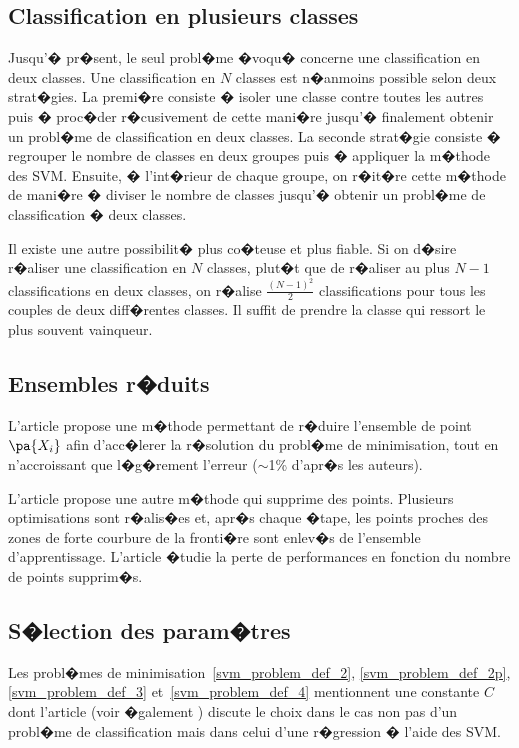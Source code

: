 \subsection{Classification en plusieurs classes}

Jusqu'� pr�sent, le seul probl�me �voqu� concerne une classification en deux classes. Une classification en $N$ classes est n�anmoins possible selon deux strat�gies. La premi�re consiste � isoler une classe contre toutes les autres puis � proc�der r�cusivement de cette mani�re jusqu'� finalement obtenir un probl�me de classification en deux classes. La seconde strat�gie consiste � regrouper le nombre de classes en deux groupes puis � appliquer la m�thode des SVM. Ensuite, � l'int�rieur de chaque groupe, on r�it�re cette m�thode de mani�re � diviser le nombre de classes jusqu'� obtenir un probl�me de classification � deux classes.

Il existe une autre possibilit� plus co�teuse et plus fiable. Si on d�sire r�aliser une classification en $N$ classes, plut�t que de r�aliser au plus $N-1$ classifications en deux classes, on r�alise $\frac{(N-1)^2}{2}$ classifications pour tous les couples de deux diff�rentes classes. Il suffit de prendre la classe qui ressort le plus souvent vainqueur.


\subsection{Ensembles r�duits}

L'article  propose une m�thode permettant de r�duire l'ensemble de point $\pa{X_i}$ afin d'acc�lerer la r�solution du probl�me de minimisation, tout en n'accroissant que l�g�rement l'erreur ($\sim$1\% d'apr�s les auteurs). 

L'article  propose une autre m�thode qui supprime des points. Plusieurs optimisations sont r�alis�es et, apr�s chaque �tape, les points proches des zones de forte courbure de la fronti�re sont enlev�s de l'ensemble d'apprentissage. L'article �tudie la perte de performances en fonction du nombre de points supprim�s.


\subsection{S�lection des param�tres}

Les probl�mes de minimisation~\ref{svm_problem_def_2}, \ref{svm_problem_def_2p}, \ref{svm_problem_def_3} et~\ref{svm_problem_def_4} mentionnent une constante $C$ dont l'article  (voir �galement ) discute le choix dans le cas non pas d'un probl�me de classification mais dans celui d'une r�gression � l'aide des SVM.

